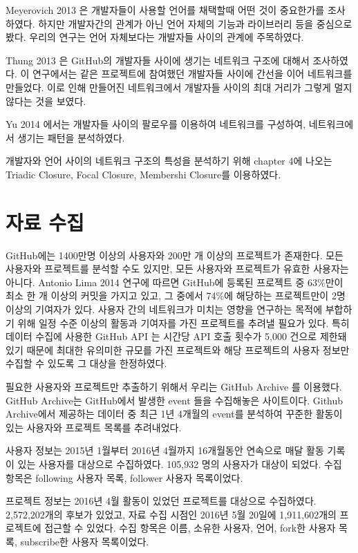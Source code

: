 \documentclass[10pt, a4paper, titlepage]{article}
\begin{document}
Meyerovich 2013 \cite{r3}은 개발자들이 사용할 언어를 채택할때 어떤 것이 중요한가를 조사하였다. 하지만 개발자간의 관계가 아닌 언어 자체의 기능과 라이브러리 등을 중심으로 봤다. 우리의 연구는 언어 자체보다는 개발자들 사이의 관계에 주목하였다.

Thung 2013 \cite{r4}은 GitHub의 개발자들 사이에 생기는 네트워크 구조에 대해서 조사하였다. 이 연구에서는 같은 프로젝트에 참여했던 개발자들 사이에 간선을 이어 네트워크를 만들었다. 이로 인해 만들어진 네트워크에서 개발자들 사이의 최대 거리가 그렇게 멀지 않다는 것을 보였다.

Yu 2014 \cite{r5}에서는 개발자들 사이의 팔로우를 이용하여 네트워크를 구성하여, 네트워크에서 생기는 패턴을 분석하였다.

개발자와 언어 사이의 네트워크 구조의 특성을 분석하기 위해 \cite{r2} chapter 4에 나오는 Triadic Closure, Focal Closure, Membershi Closure를 이용하였다.

\section {자료 수집}

GitHub에는 1400만명 이상의 사용자와 200만 개 이상의 프로젝트가 존재한다. 모든 사용자와 프로젝트를 분석할 수도 있지만, 모든 사용자와 프로젝트가 유효한 사용자는 아니다. Antonio Lima 2014 \cite{r6} 연구에 따르면 GitHub에 등록된 프로젝트 중 63\%만이 최소 한 개 이상의 커밋을 가지고 있고, 그 중에서 74\%에 해당하는 프로젝트만이 2명 이상의 기여자가 있다. 사용자 간의 네트워크가 미치는 영향을 연구하는 목적에 부합하기 위해 일정 수준 이상의 활동과 기여자를 가진 프로젝트를 추려낼 필요가 있다. 특히 데이터 수집에 사용한 GitHub API \cite{r7}는 시간당 API 호출 횟수가 5,000 건으로 제한돼 있기 때문에 최대한 유의미한 규모를 가진 프로젝트와 해당 프로젝트의 사용자 정보만 수집할 수 있도록 그 대상을 한정하였다.

	필요한 사용자와 프로젝트만 추출하기 위해서 우리는 GitHub Archive \cite{r8}를  이용했다. GitHub Archive는 GitHub에서 발생한 event \cite{r9} 들을 수집해놓은 사이트이다. Github Archive에서 제공하는 데이터 중 최근 1년 4개월의 event를 분석하여 꾸준한 활동이 있는 사용자와 프로젝트 목록를 추려내었다.

	사용자 정보는 2015년 1월부터 2016년 4월까지 16개월동안 연속으로 매달 활동 기록이 있는 사용자를 대상으로 수집하였다. 105,932 명의 사용자가 대상이 되었다. 수집 항목은 following 사용자 목록, follower 사용자 목록이었다.

	프로젝트 정보는 2016년 4월 활동이 있었던 프로젝트를 대상으로 수집하였다. 2,572,202개의 후보가 있었고, 자료 수집 시점인 2016년 5월 20일에 1,911,602개의 프로젝트에 접근할 수 있었다. 수집 항목은 이름, 소유한 사용자, 언어, fork한 사용자 목록, subscribe한 사용자 목록이었다.
\end{document}
